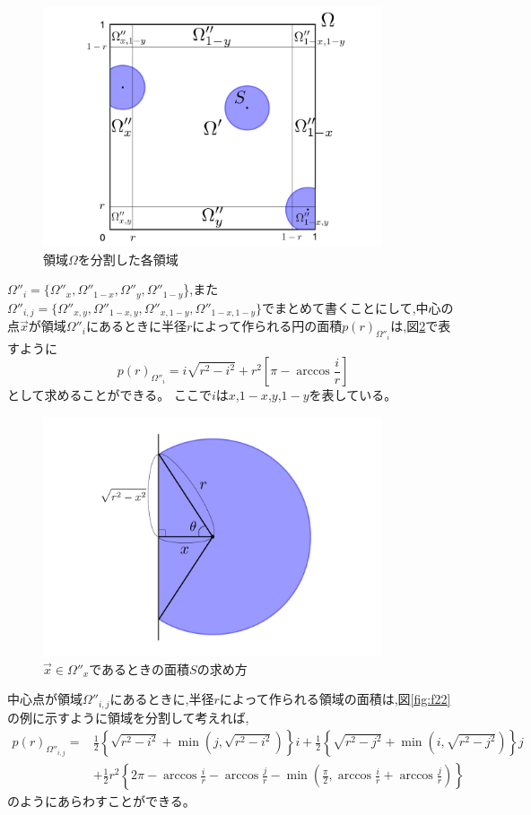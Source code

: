 \begin{figure}[H]
    \begin{center}
        \includegraphics[width=10cm]{../img/omega.jpg}
        \caption{領域$\Omega$を分割した各領域}
        \label{fig:f20}
    \end{center}
\end{figure}
$\Omega''_{i} = \{\Omega''_{x}, \Omega''_{1-x}, \Omega''_{y}, \Omega''_{1-y}$\},また$\Omega''_{i,j} = \{\Omega''_{x,y}, \Omega''_{1-x,y}, \Omega''_{x,1-y}, \Omega''_{1-x,1-y}\}$でまとめて書くことにして,中心の点$\vec{x}$が領域$\Omega''_{i}$にあるときに半径$r$によって作られる円の面積$p(r)_{\Omega''_{i}}$は,図\ref{fig:f21}で表すように
\[p(r)_{\Omega''_{i}} = i \sqrt{r^{2}-i^{2}} + r^{2} \left[ \pi -\arccos \frac{i}{r} \right]\]
として求めることができる。
ここで$i$は$x$,$1-x$,$y$,$1-y$を表している。

\begin{figure}[H]
    \begin{center}
        \includegraphics[width=10cm]{../img/omega_x.jpg}
        \caption{$\vec{x} \in \Omega''_{x}$であるときの面積$S$の求め方}
        \label{fig:f21}
    \end{center}
\end{figure}
中心点が領域$\Omega''_{i,j}$にあるときに,半径$r$によって作られる領域の面積は,図\ref{fig:f22}の例に示すように領域を分割して考えれば,
\begin{align}p(r)_{\Omega''_{i,j}} = &\frac{1}{2}\left\{ \sqrt{r^{2}-i^{2}} + \min \left(j, \sqrt{r^{2}-i^{2}}\right) \right\}i + \frac{1}{2}\left\{ \sqrt{r^{2}-j^{2}} + \min \left( i, \sqrt{r^{2}-j^{2}}\right) \right\}j \nonumber \\
&+ \frac{1}{2}r^{2} \left\{ 2\pi -\arccos \frac{i}{r}-\arccos \frac{j}{r}-\min \left( \frac{\pi}{2}, \arccos \frac{i}{r} +\arccos \frac{j}{r} \right) \right\}
\end{align}
のようにあらわすことができる。

